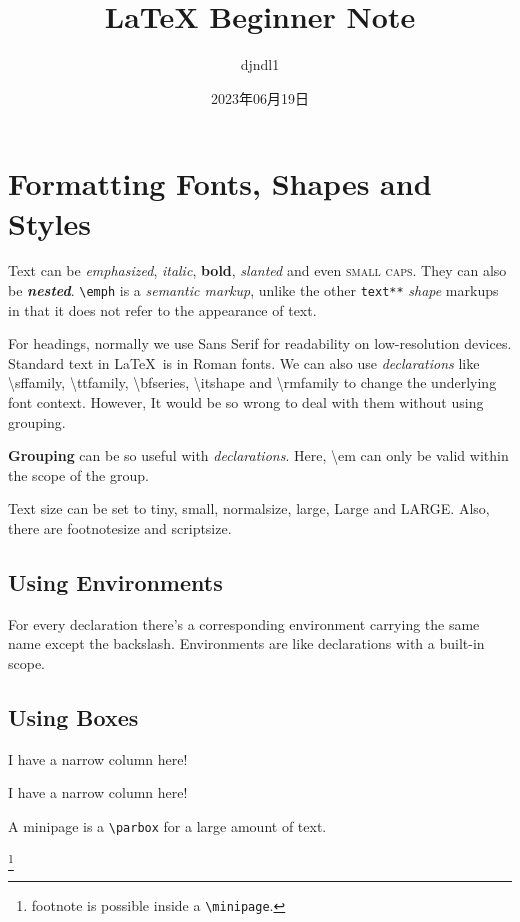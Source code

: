 \documentclass[a4paper,12pt]{article}
\newcommand{\code}[1]{\texttt{#1}}
\newcommand{\keyword}[2][\ttfamily]{{#1#2}}
\begin{document}
\title{LaTeX Beginner Note}
\author{djndl1}
\date{2023年06月19日}

\maketitle

\section{Formatting Fonts, Shapes and Styles}

Text can be \emph{emphasized}, \textit{italic}, \textbf{bold}, \textsl{slanted} and even \textsc{small caps}. They can also be \textbf{\textit{nested}}.
\code{\textbackslash emph} %
is a \emph{semantic markup}, unlike the other
\code{text**} \emph{shape}
markups in that it does not refer to the appearance of text.

For headings, normally we use \textsf{Sans Serif} for readability on low-resolution devices. Standard text in \LaTeX\ is in \textrm{Roman fonts}.
We can also use \emph{declarations} like \ttfamily \textbackslash sffamily, \textbackslash ttfamily, \textbackslash bfseries, \textbackslash itshape \normalfont and \ttfamily \textbackslash rmfamily \normalfont to change the underlying font context. However, It would be so wrong to deal with them without using grouping.



\keyword[\bfseries\sffamily]{Grouping} can be so useful with {\em declarations}. Here, {\ttfamily \textbackslash em} can only be valid within the {\ttfamily scope} of the group.

\noindent Text size can be set to {\tiny tiny}, {\small small}, {\normalsize normalsize}, {\large large}, {\Large Large} and {\LARGE LARGE}.
Also, there are {\footnotesize footnotesize} and {\scriptsize scriptsize}.


\subsection{Using Environments}

\begin{large}
  For every declaration there's a corresponding environment carrying the same name except the backslash.
  Environments are like declarations with a built-in scope.
\end{large}



\subsection{Using Boxes}

\parbox[t]{1cm}{I have a narrow column here!}
\quad
\parbox[b]{1cm}{I have a narrow column here!}
\quad
\begin{minipage}{3cm}
A minipage is a \code{\textbackslash parbox} for a large amount of text.

\footnote{footnote is possible inside a \code{\textbackslash minipage}.}
\end{minipage}
\end{document}
